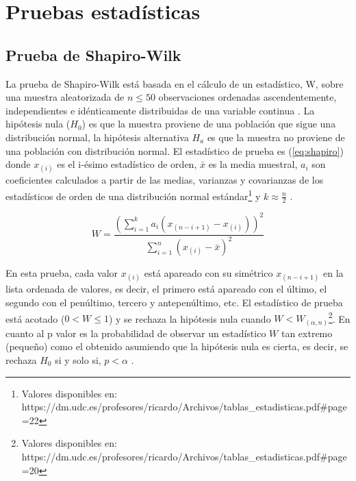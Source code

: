 \documentclass[12pt, letter paper]{report}
\begin{document}
    \section{Pruebas estadísticas} %
    \label{sec:pruebas_estadísticas}
      \subsection{Prueba de Shapiro-Wilk} %
      \label{sub:prueba_de_shapiro_wilk}
        La prueba de Shapiro-Wilk \cite{shapiro1965analysis} está basada en el
        cálculo de un estadístico, W, sobre una muestra aleatorizada de $n\le50$
        observaciones ordenadas ascendentemente, independientes e idénticamente
        distribuidas de una variable continua \cite{royston1982algorithm}. La
        hipótesis nula ($H_0$) es que la muestra proviene de una población que
        sigue una distribución normal, la hipótesis alternativa $H_a$ es que la
        muestra no proviene de una población con distribución normal. El
        estadístico de prueba es (\ref{eq:shapiro}) donde $x_{(i)}$ es el
        i-ésimo estadístico de orden, $\bar{x}$ es la media muestral, $a_i$ son
        coeficientes calculados a partir de las medias, varianzas y covarianzas
        de los estadísticos de orden de una distribución normal
        estándar\footnote[1]{Valores disponibles en: https://dm.udc.es/profesores/ricardo/Archivos/tablas\_estadisticas.pdf\#page=22}
        y $\displaystyle k \approx \frac{n}{2}$ \cite{shapiro1965analysis}.

        \begin{equation}
          W = \dfrac{\displaystyle \left (
            \sum_{i = 1}^k a_i \left ( x_{(n-i+1)} - x_{(i)} \right )
          \right ) ^ 2}{\displaystyle \sum_{i = 1}^n \left (
            x_{(i)} - \bar{x}
          \right ) ^ 2}
          \label{eq:shapiro}
        \end{equation}

        En esta prueba, cada valor $x_{(i)}$ está apareado con su simétrico
        $x_{(n - i + 1)}$ en la lista ordenada de valores, es decir, el primero
        está apareado con el último, el segundo con el penúltimo, tercero y
        antepenúltimo, etc. El estadístico de prueba está acotado
        ($0 < W \le 1$) y se rechaza la hipótesis nula cuando $W < W_{(\alpha,
        n)}$\footnote[2]{Valores disponibles en: https://dm.udc.es/profesores/ricardo/Archivos/tablas\_estadisticas.pdf\#page=20}.
        En cuanto al p valor es la probabilidad de observar un estadístico $W$
        tan extremo (pequeño) como el obtenido asumiendo que la hipótesis nula
        es cierta, es decir, se rechaza $H_0$ si y solo si, $p < \alpha$
        \cite{royston1982algorithm}.
\end{document}
